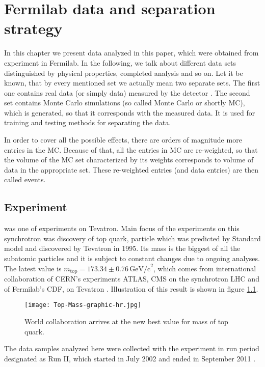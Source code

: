 \chapter{Fermilab data and separation strategy}

In this chapter we present data analyzed in this paper, which were obtained from experiment \dzero in Fermilab. In the following, we talk about different data sets distinguished by physical properties, completed analysis and so on. Let it be known, that by every mentioned set we actually mean two separate sets. The first one contains real data (or simply data) measured by the detector \dzero. The second set contains Monte Carlo simulations (so called Monte Carlo or shortly MC), which is generated, so that it corresponds with the measured data. It is used for training and testing methods for separating the data. 

In order to cover all the possible effects, there are orders of magnitude more entries in the MC. Because of that, all the entries in MC are re-weighted, so that the volume of the MC set characterized by its weights corresponds to volume of data in the appropriate set. These re-weighted entries (and data entries) are then called events.

\section{\texorpdfstring{\dzero}{D0} Experiment}
\dzero was one of experiments on Tevatron. Main focus of the experiments on this synchrotron was discovery of top quark, particle which was predicted by Standard model and discovered by Tevatron in 1995. Its mass is the biggest of all the subatomic particles and it is subject to constant changes due to ongoing analyses. The latest value is $m_\mathrm{top} = 173.34 \pm 0.76 \,\mathrm{GeV/c}^2 $, which comes from international collaboration of CERN's experiments ATLAS, CMS on the synchrotron LHC and of Fermilab's CDF, \dzero on Tevatron \cite{jointMass}. Illustration of this result is shown in figure \ref{fig:jointMass}. 

\begin{figure}[h]
	\centering
	\texttt{[image: Top-Mass-graphic-hr.jpg]}
	\caption{World collaboration arrives at the new best value for mass of top quark.}
	\label{fig:jointMass}
\end{figure}

The data samples analyzed here were collected with the \dzero experiment in run period designated as Run II, which started in July 2002 and ended in September 2011 \cite{Yuntse}.

